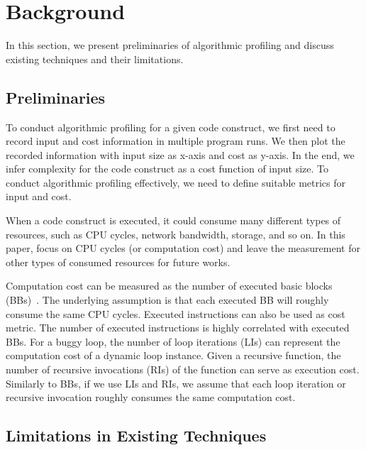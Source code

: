 
\section{Background}
\label{sec:back}

In this section, we present preliminaries of 
algorithmic profiling and discuss existing techniques and their
limitations. 


\subsection{Preliminaries}

To conduct algorithmic profiling for a given code construct,
we first need to record input and cost information in multiple program runs. 
We then plot the recorded information with input size as x-axis and cost as y-axis.
In the end, we infer complexity for the code construct as a cost function of input size. 
To conduct algorithmic profiling effectively, 
we need to define suitable metrics for input and cost. 

%

When a code construct is executed,
it could consume many different types of resources, 
such as CPU cycles, network bandwidth, storage, and so on.
In this paper, focus on CPU cycles (or computation cost) 
and leave the measurement for other types of 
consumed resources for future works. 

Computation cost can be measured 
as the number of executed basic blocks (BBs)~\cite{Aprof1,Aprof2}.
The underlying assumption is that each executed 
BB will roughly consume the same CPU cycles. 
Executed instructions can also be used as cost metric. 
The number of executed instructions is highly correlated with executed BBs.
For a buggy loop, the number of loop iterations (LIs) can represent 
the computation cost of a dynamic loop instance.
Given a recursive function, the number of recursive invocations (RIs) 
of the function can serve as execution cost.
Similarly to BBs, if we use LIs and RIs, 
we assume that each loop iteration or recursive invocation 
roughly consumes the same computation cost. 



\subsection{Limitations in Existing Techniques}


